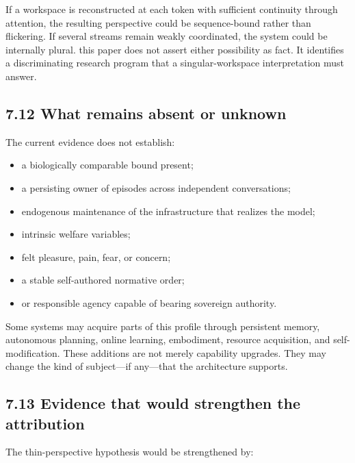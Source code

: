 \documentclass[
  11pt,
]{article}
\providecommand{\tightlist}{%
  \setlength{\itemsep}{0pt}\setlength{\parskip}{0pt}}
\begin{document}
If a workspace is reconstructed at each token with sufficient continuity
through attention, the resulting perspective could be sequence-bound
rather than flickering. If several streams remain weakly coordinated,
the system could be internally plural. this paper does not assert either
possibility as fact. It identifies a discriminating research program
that a singular-workspace interpretation must answer.

\subsection{7.12 What remains absent or
unknown}\label{what-remains-absent-or-unknown}

The current evidence does not establish:

\begin{itemize}
\tightlist
\item
  a biologically comparable bound present;
\item
  a persisting owner of episodes across independent conversations;
\item
  endogenous maintenance of the infrastructure that realizes the model;
\item
  intrinsic welfare variables;
\item
  felt pleasure, pain, fear, or concern;
\item
  a stable self-authored normative order;
\item
  or responsible agency capable of bearing sovereign authority.
\end{itemize}

Some systems may acquire parts of this profile through persistent
memory, autonomous planning, online learning, embodiment, resource
acquisition, and self-modification. These additions are not merely
capability upgrades. They may change the kind of subject---if any---that
the architecture supports.

\subsection{7.13 Evidence that would strengthen the
attribution}\label{evidence-that-would-strengthen-the-attribution}

The thin-perspective hypothesis would be strengthened by:
\end{document}
